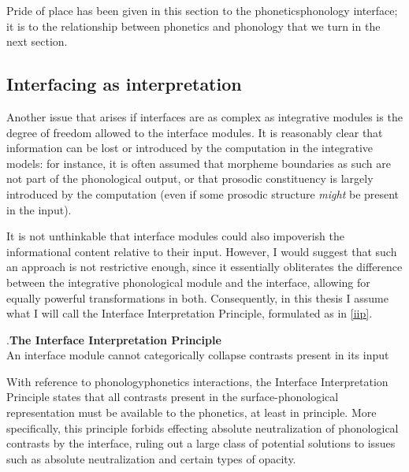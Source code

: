 Pride of place has been given in this section to the phonetics\endash phonology interface; it is to the relationship between phonetics and phonology that we turn in the next section.

\subsection{Interfacing as interpretation}
\label{sec:interf-as-interpr}

Another issue that arises if interfaces are as complex as integrative modules is the degree of freedom allowed to the interface modules. It is reasonably clear that information can be lost or introduced by the computation in the integrative models: for instance, it is often assumed that morpheme boundaries as such are not part of the phonological output, or that prosodic constituency is largely introduced by the computation (even if some prosodic structure \emph{might} be present in the input).

It is not unthinkable that interface modules could also impoverish the informational content relative to their input. However, I would suggest that such an approach is not restrictive enough, since it essentially obliterates the difference between the integrative phonological module and the interface, allowing for equally powerful transformations in both. Consequently, in this thesis I assume what I will call the Interface Interpretation Principle, formulated as in \ref{iip}.

\ex.\label{iip}\textbf{The Interface Interpretation Principle}\\
An interface module cannot categorically collapse contrasts present in its input

With reference to phonology\endash phonetics interactions, the Interface Interpretation Principle states that all contrasts present in the surface\hyp phonological representation must be available to the phonetics, at least in principle. More specifically, this principle forbids effecting absolute neutralization of phonological contrasts by the interface, ruling out a large class of potential solutions to issues such as absolute neutralization and certain types of opacity.


